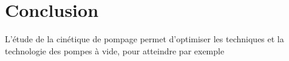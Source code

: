 \section{Conclusion}

L'étude de la cinétique de pompage permet d'optimiser les techniques et la technologie des pompes à vide, pour atteindre par exemple 
